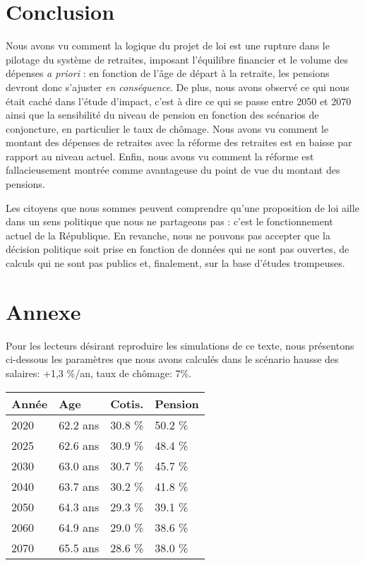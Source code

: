 \documentclass[10pt]{article}
\begin{document}

\section{Conclusion}

Nous avons vu comment la logique du projet de loi est une 
rupture dans le pilotage du système de retraites, 
imposant l'équilibre financier et le volume des dépenses 
\emph{a priori} : en fonction de l'âge de départ à la retraite, 
les pensions devront donc s'ajuster \emph{en conséquence}. 
De plus, nous avons observé ce qui nous était caché dans l'étude 
d'impact, c'est à dire ce qui se passe entre 2050 et 2070 ainsi que 
la sensibilité du niveau de pension en fonction des scénarios 
de conjoncture, en particulier le taux de chômage. 
Nous avons vu comment le montant des dépenses de retraites avec la réforme 
des retraites est en baisse par rapport au niveau actuel. 
Enfin, nous avons vu comment la réforme est fallacieusement 
montrée comme avantageuse du point de vue du montant des pensions. 

Les citoyens que nous sommes peuvent comprendre qu'une proposition de loi 
aille dans un sens politique que nous ne partageons pas : c'est le 
fonctionnement actuel de la République. 
En revanche, nous ne pouvons pas accepter que la décision politique soit 
prise en fonction de données qui ne sont pas ouvertes, 
de calculs qui ne sont pas publics et, finalement, sur la base d'études trompeuses. 


\section{Annexe}

Pour les lecteurs désirant reproduire les simulations de ce texte, 
nous présentons ci-dessous les paramètres que nous avons calculés dans 
le scénario hausse des salaires: +1,3 \%/an, taux de chômage: 7\%.

\begin{center}
\begin{tabular}{l|lll}
\textbf{Année} & \textbf{Age} & \textbf{Cotis.} & \textbf{Pension} \\
\hline
2020 & 62.2 ans & 30.8 \% & 50.2 \% \\
2025 & 62.6 ans & 30.9 \% & 48.4 \% \\
2030 & 63.0 ans & 30.7 \% & 45.7 \% \\
2040 & 63.7 ans & 30.2 \% & 41.8 \% \\
2050 & 64.3 ans & 29.3 \% & 39.1 \% \\
2060 & 64.9 ans & 29.0 \% & 38.6 \% \\
2070 & 65.5 ans & 28.6 \% & 38.0 \%
\end{tabular}
\end{center}
\end{document}
